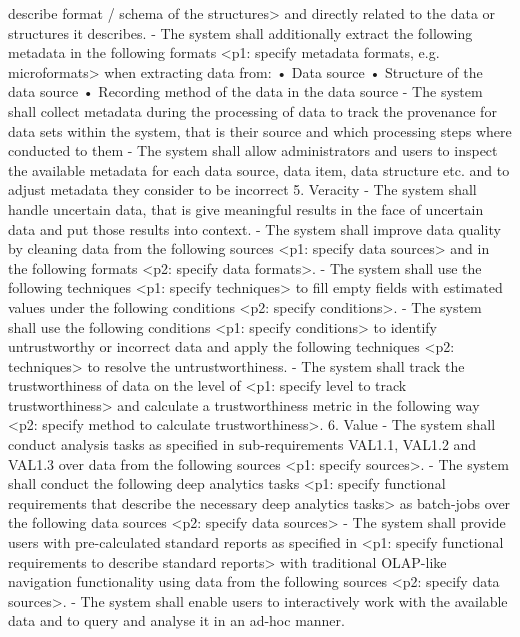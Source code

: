 \documentclass[conference]{IEEEtran}
\begin{document}
    describe format / schema of the structures> and directly related to the data
    or structures it describes.
    - The system shall additionally extract the following metadata in the following
    formats <p1: specify metadata formats, e.g. microformats> when extracting
    data from:
    • Data source
    • Structure of the data source
    • Recording method of the data in the data source
    - The system shall collect metadata during the processing of data to track the
    provenance for data sets within the system, that is their source and which
    processing steps where conducted to them
    - The system shall allow administrators and users to inspect the available
    metadata for each data source, data item, data structure etc. and to adjust
    metadata they consider to be incorrect
5. Veracity 
    - The system shall handle uncertain data, that is give meaningful results in the
    face of uncertain data and put those results into context.
    - The system shall improve data quality by cleaning data from the following
    sources <p1: specify data sources> and in the following formats <p2: specify
    data formats>.
    - The system shall use the following techniques <p1: specify techniques> to fill
    empty fields with estimated values under the following conditions <p2: specify
    conditions>.
    - The system shall use the following conditions <p1: specify conditions> to
    identify untrustworthy or incorrect data and apply the following techniques
    <p2: techniques> to resolve the untrustworthiness.
    - The system shall track the trustworthiness of data on the level of <p1: specify
    level to track trustworthiness> and calculate a trustworthiness metric in the
    following way <p2: specify method to calculate trustworthiness>.
6. Value 
    - The system shall conduct analysis tasks as specified in sub-requirements VAL1.1,
    VAL1.2 and VAL1.3 over data from the following sources <p1: specify sources>.
    - The system shall conduct the following deep analytics tasks <p1: specify
    functional requirements that describe the necessary deep analytics tasks> as
    batch-jobs over the following data sources <p2: specify data sources>
    - The system shall provide users with pre-calculated standard reports as specified
    in <p1: specify functional requirements to describe standard reports> with
    traditional OLAP-like navigation functionality using data from the following
    sources <p2: specify data sources>.
    - The system shall enable users to interactively work with the available data
    and to query and analyse it in an ad-hoc manner.
\end{document}
